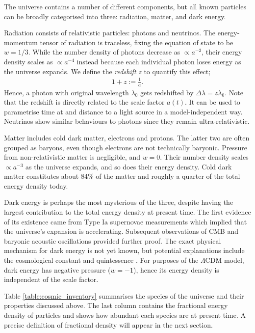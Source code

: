 The universe contains a number of different components, but all known particles can be broadly categorised into three: radiation, matter, and dark energy.

Radiation consists of relativistic particles: photons and neutrinos. The energy-momentum tensor of radiation is traceless, fixing the equation of state to be $w=1/3$. While the number density of photons decrease as $\propto a^{-3}$, their energy density scales as $\propto a^{-4}$ instead because each individual photon loses energy as the universe expands. We define the \textit{redshift} $z$ to quantify this effect;
\begin{align}
	1 + z := \frac{1}{a}.	\label{def:redshift}
\end{align}
Hence, a photon with original wavelength $\lambda_0$ gets redshifted by $\Delta\lambda = z \lambda_0$. Note that the redshift is directly related to the scale factor $a(t)$. It can be used to parametrise time at and distance to a light source in a model-independent way. Neutrinos show similar behaviours to photons since they remain ultra-relativistic.

Matter includes cold dark matter, electrons and protons. The latter two are often grouped as baryons, even though electrons are not technically baryonic. Pressure from non-relativistic matter is negligible, and $w = 0$. Their number density scales $\propto a^{-3}$ as the universe expands, and so does their energy density. Cold dark matter constitutes about 84\% of the matter and roughly a quarter of the total energy density today.

Dark energy is perhaps the most mysterious of the three, despite having the largest contribution to the total energy density at present time. The first evidence of its existence came from Type Ia supernovae measurements which implied that the universe's expansion is accelerating. Subsequent observations of CMB and baryonic acoustic oscillations provided further proof. The exact physical mechanism for dark energy is not yet known, but potential explanations include the cosmological constant and quintessence \cite{Ratra1988quintessence,Caldwell1998quintessence}. For purposes of the $\Lambda$CDM model, dark energy has negative pressure ($w=-1$), hence its energy density is independent of the scale factor.

Table \ref{table:cosmic_inventory} summarises the species of the universe and their properties discussed above. The last column contains the fractional energy density of particles and shows how abundant each species are at present time. A precise definition of fractional density will appear in the next section.

